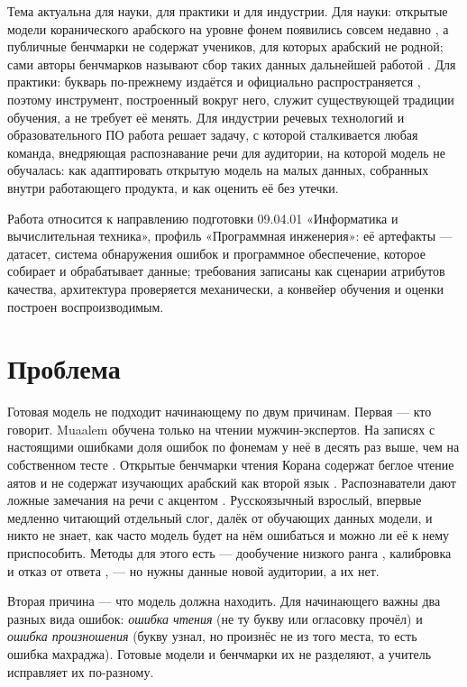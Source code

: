 Тема актуальна для науки, для практики и для индустрии. Для науки: открытые модели коранического арабского
на уровне фонем появились совсем недавно \cite{SRC-002}, а публичные бенчмарки не содержат учеников, для
которых арабский не родной; сами авторы бенчмарков называют сбор таких данных дальнейшей работой
\cite{SRC-004,SRC-031}. Для практики: букварь по-прежнему издаётся и официально распространяется
\cite{SRC-040,SRC-020}, поэтому инструмент, построенный вокруг него, служит существующей традиции обучения, а не
требует её менять. Для индустрии речевых технологий и образовательного ПО работа решает задачу, с которой
сталкивается любая команда, внедряющая распознавание речи для аудитории, на которой модель не обучалась: как
адаптировать открытую модель на малых данных, собранных внутри работающего продукта, и как оценить её без утечки.

Работа относится к направлению подготовки 09.04.01 «Информатика и вычислительная техника», профиль
«Программная инженерия»: её артефакты --- датасет, система обнаружения ошибок и программное обеспечение, которое собирает и
обрабатывает данные; требования записаны как сценарии атрибутов качества, архитектура проверяется механически,
а конвейер обучения и оценки построен воспроизводимым.

\section{Проблема}

Готовая модель не подходит начинающему по двум причинам. Первая --- кто говорит. Muaalem обучена только на
чтении мужчин-экспертов. На записях с настоящими ошибками доля ошибок по фонемам у неё в десять раз выше,
чем на собственном тесте \cite{SRC-002}. Открытые бенчмарки чтения Корана содержат беглое чтение аятов и не
содержат изучающих арабский как второй язык \cite{SRC-004,SRC-031,SRC-043}. Распознаватели дают ложные
замечания на речи с акцентом \cite{SRC-026}. Русскоязычный взрослый, впервые медленно читающий отдельный
слог, далёк от обучающих данных модели, и никто не знает, как часто модель будет на нём ошибаться и можно ли
её к нему приспособить. Методы для этого есть --- дообучение низкого ранга \cite{SRC-111}, калибровка и отказ
от ответа \cite{SRC-112,SRC-117}, --- но нужны данные новой аудитории, а их нет.

Вторая причина --- что модель должна находить. Для начинающего важны два разных вида ошибок: \emph{ошибка
чтения} (не ту букву или огласовку прочёл) и \emph{ошибка произношения} (букву узнал, но произнёс не из того
места, то есть ошибка махраджа). Готовые модели и бенчмарки их не разделяют, а учитель исправляет их по-разному.

